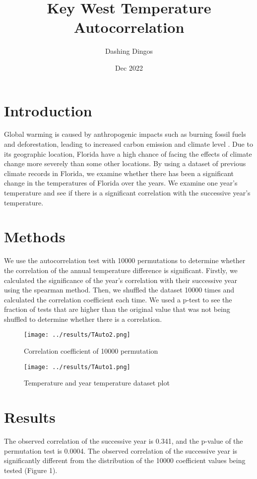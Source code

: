 \documentclass{article}
\title{Key West Temperature Autocorrelation}
\author{Dashing Dingos}
\date{Dec 2022}
\begin{document}
\section{Introduction}
Global warming is caused by anthropogenic impacts such as burning fossil fuels and deforestation, leading to increased carbon emission and climate level \cite{houghton2005global}.
Due to its geographic location, Florida have a high chance of facing the effects of climate change more severely than some other locations.
By using a dataset of previous climate records in Florida, we examine whether there has been a significant change in the temperatures of Florida over the years.
We examine one year's temperature and see if there is a significant correlation with the successive year's temperature.

\section{Methods}
We use the autocorrelation test with 10000 permutations to determine whether the correlation of the annual temperature difference is significant.
Firstly, we calculated the significance of the year's correlation with their successive year using the spearman method.
Then, we shuffled the dataset 10000 times and calculated the correlation coefficient each time.
We used a p-test to see the fraction of tests that are higher than the original value that was not being shuffled to determine whether there is a correlation.

\begin{figure}[H]
    \begin{center}
\centering
\texttt{[image: ../results/TAuto2.png]}
\caption{Correlation coefficient of 10000 permutation}
\end{center}
\end{figure}

\begin{figure}[H]
    \begin{center}
\centering
\texttt{[image: ../results/TAuto1.png]}
\caption{Temperature and year temperature dataset plot}
\end{center}
\end{figure}

\section{Results}
The observed correlation of the successive year is 0.341, and the p-value of the permutation test is 0.0004. 
The observed correlation of the successive year is significantly different from the distribution of the 10000 coefficient values being tested (Figure 1).
\end{document}
